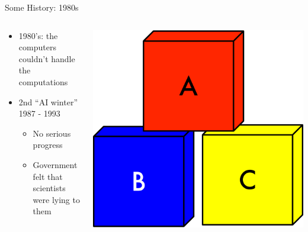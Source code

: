 \documentclass[aspectratio=169]{beamer}
\begin{document}
\begin{frame}{Some History: 1980s}

\begin{columns}
\begin{column}{0.6\textwidth}
\begin{itemize}
	\item 1980's: the computers couldn't handle the computations
	\item 2nd ``AI winter'' 1987 - 1993
	\begin{itemize}
		\item No serious progress
		\item Government felt that scientists were lying to them
	\end{itemize}
\end{itemize}
\end{column}
\begin{column}{0.4\textwidth}
\includegraphics[width=1\textwidth]{lectFF/blocks.pdf}
\end{column}
\end{columns}
\end{frame}
\end{document}
